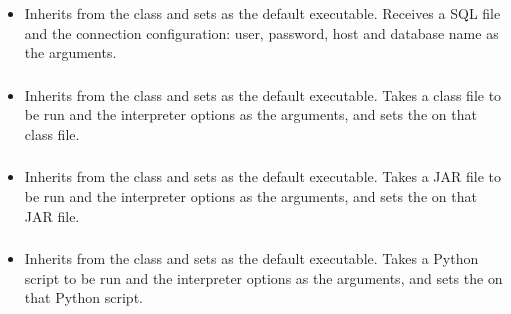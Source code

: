 \subsubsection*{}\label{subsec:RunPSQL}

\begin{itemize}[label={}]
    \item Inherits from the \hyperref[subsec:Run]{} class and sets  as the default
          executable.
          Receives a SQL file and the connection configuration: user, password, host and database name as the
          arguments.
\end{itemize}

\subsubsection*{}\label{subsec:RunJavaClass}

\begin{itemize}[label={}]
    \item Inherits from the \hyperref[subsec:Run]{} class and sets  as the default
          executable.
          Takes a class file to be run and the interpreter options as the arguments, and sets the
          \hyperref[subsec:FileExistsPrerequisite]{} on that class file.
\end{itemize}

\subsubsection*{}\label{subsec:RunJar}

\begin{itemize}[label={}]
    \item Inherits from the \hyperref[subsec:Run]{} class and sets  as the default
          executable.
          Takes a JAR file to be run and the interpreter options as the arguments, and sets the
          \hyperref[subsec:FileExistsPrerequisite]{} on that JAR file.
\end{itemize}

\subsubsection*{}\label{subsec:RunPython}

\begin{itemize}[label={}]
    \item Inherits from the \hyperref[subsec:Run]{} class and sets  as the default
          executable.
          Takes a Python script to be run and the interpreter options as the arguments, and sets the
          \hyperref[subsec:FileExistsPrerequisite]{} on that Python script.
\end{itemize}

